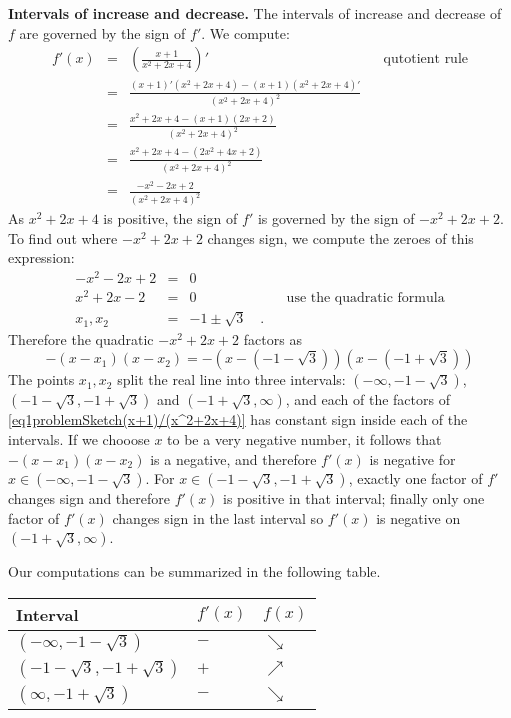 {\textbf{Intervals of increase and decrease.} 
The intervals of increase and decrease of $f$ are governed by the sign of $f'$. We compute:
\[
\begin{array}{rcll|l}
f'(x)&=&\displaystyle \left(\frac{x+1}{x^2+2x+4}\right)' &&\text{qutotient rule}\\
&=&\displaystyle \frac{(x+1)'\left(x^2+ 2x+4\right)- (x+1)\left( x^2 +2 x+4\right)'}{\left(x^2+2x+4 \right)^2}\\
&=&\displaystyle\frac{ x^2+2x+4-(x+1)(2x+2)}{\left(x^2+2x+4 \right)^2}\\
&=&\displaystyle \frac{x^2+2x+4-\left( 2x^2+ 4x+ 2 \right)}{ \left( x^2 +2x+4 \right)^2}\\
&=&\displaystyle \frac{-x^2-2x+2}{\left(x^2+2x+4 \right)^2}
\end{array}
\] 
As $x^2+2x+4$ is positive, the sign of $f'$ is governed by the sign of $-x^2+2x+2$. To find out where $-x^2+2x+2$ changes sign, we compute the zeroes of this expression:
\[\begin{array}{rcll|l}
-x^2-2x+2&=&0\\
x^2+2x-2&=&0 &&\text{use the quadratic formula}\\
x_1, x_2&=& -1\pm \sqrt{3}\quad .
\end{array}
\]
Therefore the quadratic $-x^2+2x+2$ factors as 
\begin{equation}
\label{eq1problemSketch(x+1)/(x^2+2x+4)}
-(x-x_1)(x-x_2)=-\left(x-\left(-1-\sqrt{3}\right)\right)\left(x-\left(-1+\sqrt{3}\right)\right)
\end{equation} 
The points $x_1, x_2$ split the real line into three intervals: $(-\infty, -1-\sqrt{3})$, $(-1-\sqrt{3}, -1+\sqrt{3})$ and $(-1+ \sqrt{3}, \infty )$, and each of the factors of \eqref{eq1problemSketch(x+1)/(x^2+2x+4)} has constant sign inside each of the intervals. If we chooose $x$ to be a very negative number, it follows that $-(x-x_1)(x-x_2)$ is a negative, and therefore $ f'(x)$ is negative for $x\in(-\infty, -1-\sqrt{3})$. For $x\in (-1-\sqrt{3}, -1+\sqrt{3})$, exactly one factor of $f'$ changes sign and therefore $f'(x)$ is positive in that interval; finally only one factor of $f'(x)$ changes sign in the last interval so $f'(x)$ is negative on $(-1+ \sqrt{3}, \infty )$.

Our computations can be summarized in the following table. 
\begin{tabular}{|lll|}\hline
Interval & $f'(x)$ & $f(x)$   \\\hline
$(-\infty, -1-\sqrt{3})$ & $-$& $\searrow $ \\\hline
$(-1-\sqrt{3}, -1+\sqrt{3})$ &$+$&$\nearrow$\\\hline
$(\infty, -1+\sqrt{3})$&$-$&$\searrow$ \\\hline
\end{tabular}

}
